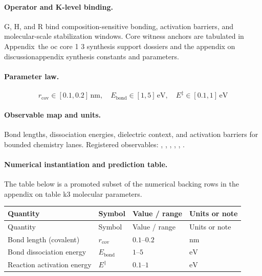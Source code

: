 \paragraph{Operator and K-level binding.}
G, H, and R bind composition-sensitive bonding, activation barriers, and molecular-scale stabilization windows.
Core witness anchors are tabulated in Appendix~the oc core 1 3 synthesis support dossiers and the appendix on discussionappendix synthesis constants and parameters.

\paragraph{Parameter law.}
\[
r_{\mathrm{cov}} \in [0.1, 0.2]\,\mathrm{nm},\quad E_{\mathrm{bond}} \in [1, 5]\,\mathrm{eV},\quad E^\ddagger \in [0.1, 1]\,\mathrm{eV}
\]

\paragraph{Observable map and units.}
Bond lengths, dissociation energies, dielectric context, and activation barriers for bounded chemistry lanes.
Registered observables: , \allowbreak {}, \allowbreak {}, \allowbreak {}, \allowbreak {}, \allowbreak {}.

\paragraph{Numerical instantiation and prediction table.}
The table below is a promoted subset of the numerical backing rows in the appendix on table k3 molecular parameters.
\begin{longtable}{@{}L{0.27\textwidth}L{0.15\textwidth}L{0.24\textwidth}L{0.16\textwidth}@{}}
\toprule
Quantity & Symbol & Value / range & Units or note \\
\midrule
\endfirsthead
\toprule
Quantity & Symbol & Value / range & Units or note \\
\midrule
\endhead
Bond length (covalent) & $\scriptstyle r_{\mathrm{cov}}$ & $0.1\text{--}0.2$ & $\mathrm{nm}$ \\
Bond dissociation energy & $\scriptstyle E_{\mathrm{bond}}$ & $1\text{--}5$ & $\mathrm{eV}$ \\
Reaction activation energy & $\scriptstyle E^\ddagger$ & $0.1\text{--}1$ & $\mathrm{eV}$ \\
\bottomrule
\end{longtable}


